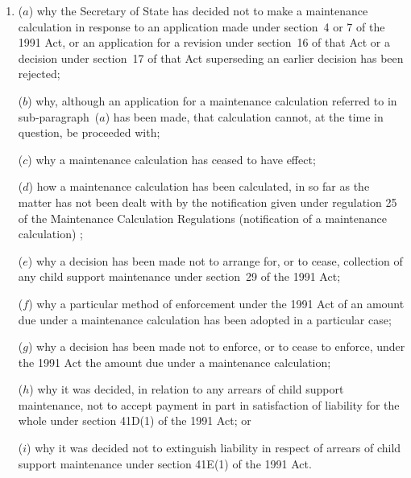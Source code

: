 \documentclass[12pt,a4paper]{article}
\begin{document}
\begin{enumerate}\item[]
($a$) why 
the Secretary of State  %
has decided not to make a maintenance calculation in response to an application made under section~4 or 7 of the 1991 Act, or an application for a revision under section~16 of that Act or a decision under section~17 of that Act superseding an earlier decision has been rejected;

($b$) why, although an application for a maintenance calculation referred to in sub-paragraph~($a$)  has been made, that calculation cannot, at the time in question, be proceeded with;

($c$) why a maintenance calculation has ceased to have effect;

($d$) how a maintenance calculation has been calculated, in so far as the matter has not been dealt with by the notification given under 
regulation 25 of the Maintenance Calculation Regulations (notification of a maintenance calculation)%
;

($e$) why a decision has been made not to arrange for, or to cease, collection of any child support maintenance under section~29 of the 1991 Act;

($f$) why a particular method of enforcement under the 1991 Act of an amount due under a maintenance calculation has been adopted in a particular case;

($g$) why a decision has been made not to enforce, or to cease to enforce, under the 1991 Act the amount due under a maintenance calculation;

($h$) why it was decided, in relation to any arrears of child support maintenance, not to accept payment in part in satisfaction of liability for the whole under section 41D(1) of the 1991 Act; or

($i$) why it was decided not to extinguish liability in respect of arrears of child support maintenance under section 41E(1) of the 1991 Act.

\end{enumerate}
\end{document}

